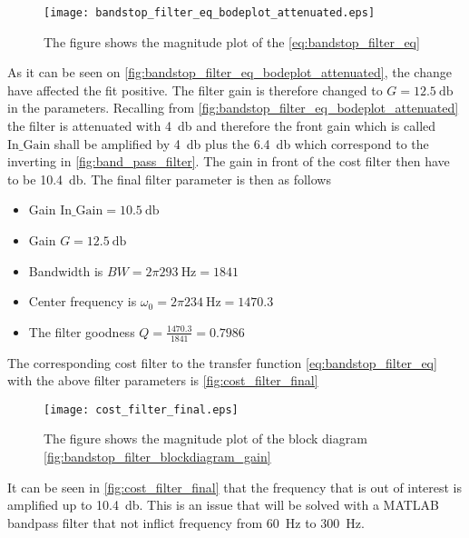 \begin{figure}[H]
	\centering
	\texttt{[image: bandstop\_filter\_eq\_bodeplot\_attenuated.eps]}
	\caption{The figure shows the magnitude plot of the \autoref{eq:bandstop_filter_eq}}
		\label{fig:bandstop_filter_eq_bodeplot_attenuated}
\end{figure}


As it can be seen on \autoref{fig:bandstop_filter_eq_bodeplot_attenuated}, the change have affected the fit positive. The filter gain is therefore changed to  $G = \SI{12.5}{\decibel}$ in the parameters. Recalling from \autoref{fig:bandstop_filter_eq_bodeplot_attenuated} the filter is attenuated with \SI{4}{\decibel} and therefore the front gain which is called $\text{In_Gain}$ shall be amplified by \SI{4}{\decibel} plus the \SI{6.4}{\decibel} which correspond to the inverting in \autoref{fig:band_pass_filter}. The gain in front of the cost filter then have to be \SI{10.4}{\decibel}. The final filter parameter is then as follows




\begin{itemize}
\item Gain $\text{In_Gain} = \SI{10.5}{\decibel}$
\item Gain $G = \SI{12.5}{\decibel}$
\item Bandwidth is $BW = 2\pi \SI{293}{\hertz} = 1841$
\item Center frequency is $\omega_0 = 2\pi \SI{234}{\hertz} = 1470.3$
\item The filter goodness $Q = \frac{1470.3}{1841} = 0.7986$
\end{itemize}




The corresponding cost filter to the transfer function \autoref{eq:bandstop_filter_eq} with the above filter parameters is \autoref{fig:cost_filter_final}

\begin{figure}[H]
	\centering
	\texttt{[image: cost\_filter\_final.eps]}
	\caption{The figure shows the magnitude plot of the block diagram \autoref{fig:bandstop_filter_blockdiagram_gain}}
		\label{fig:cost_filter_final}
\end{figure}

It can be seen in \autoref{fig:cost_filter_final} that the frequency that is out of interest is amplified up to \SI{10.4}{\decibel}. This is an issue that will be solved with a MATLAB bandpass filter that not inflict frequency from \SI{60}{\hertz} to \SI{300}{\hertz}.
 


